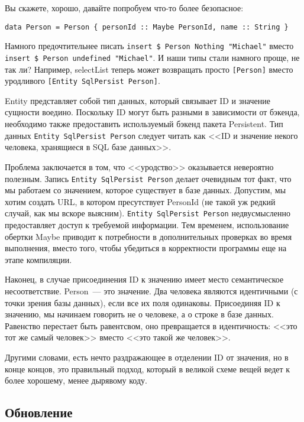 Вы скажете, хорошо, давайте попробуем что-то более безопасное:

\begin{lstlisting}
data Person = Person { personId :: Maybe PersonId, name :: String }
\end{lstlisting}

Намного предочтительнее писать \lstinline'insert $ Person Nothing "Michael"' вместо \lstinline'insert $ Person undefined "Michael"'. И наши типы стали намного проще, не так ли? Например, selectList теперь может возвращать просто \lstinline'[Person]' вместо уродливого \lstinline'[Entity SqlPersist Person]'.

\begin{remark}
Entity представляет собой тип данных, который связывает ID и значение сущности воедино. Поскольку ID могут быть разными в зависимости от бэкенда, необходимо также предоставить используемый бэкенд пакета Persistent. Тип данных \lstinline'Entity SqlPersist Person' следует читать как <<ID и значение некого человека, хранящиеся в SQL базе данных>>.
\end{remark}

Проблема заключается в том, что <<уродство>> оказывается невероятно полезным. Запись \lstinline'Entity SqlPersist Person' делает очевидным тот факт, что мы работаем со значением, которое существует в базе данных. Допустим, мы хотим создать URL, в котором пресутствует PersonId (не такой уж редкий случай, как мы вскоре выясним). \lstinline'Entity SqlPersist Person' недвусмысленно предоставляет доступ к требуемой информации. Тем временем, использование обертки Maybe приводит к потребности в дополнительных проверках во время выполнения, вместо того, чтобы убедиться в корректности программы еще на этапе компиляции.

Наконец, в случае присоединения ID к значению имеет место семантическое несоответствие. Person~--- это значение. Два человека являются идентичными (с точки зрения базы данных), если все их поля одинаковы. Присоединяя ID к значению, мы начинаем говорить не о человеке, а о строке в базе данных. Равенство перестает быть равентсвом, оно превращается в идентичность: <<это тот же самый человек>> вместо <<это такой же человек>>.

Другими словами, есть нечто раздражающее в отделении ID от значения, но в конце концов, это правильный подход, который в великой схеме вещей ведет к более хорошему, менее дырявому коду.

\subsection{Обновление} %

